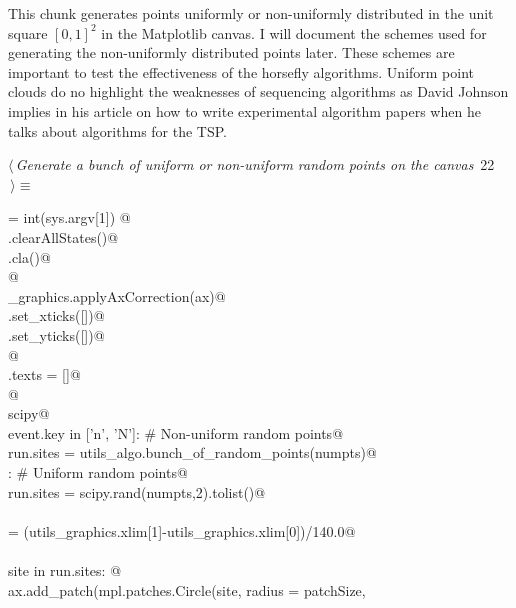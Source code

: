 \documentclass[11.5pt]{report}
\begin{document}
\newchunk This chunk generates points uniformly or non-uniformly distributed in the 
unit square $[0,1]^2$ in the Matplotlib canvas. I will document the schemes used for 
generating the non-uniformly distributed points later. These schemes are important to test the effectiveness of 
the horsefly algorithms. Uniform point clouds do no highlight the weaknesses of 
sequencing algorithms as David Johnson implies in his article on how to write 
experimental algorithm papers when he talks about algorithms for the TSP. 

\begin{flushleft} \small\label{scrap15}\raggedright\small
{} $\langle\,${\itshape Generate a bunch of uniform or non-uniform random points on the canvas}\nobreak\ {\footnotesize {22}}$\,\rangle\equiv$
\vspace{-1ex}
\begin{list}{}{} \item
\mbox{}\verb@numpts = int(sys.argv[1]) @\\
\mbox{}\verb@run.clearAllStates()@\\
\mbox{}\verb@ax.cla()@\\
\mbox{}\verb@               @\\
\mbox{}\verb@utils_graphics.applyAxCorrection(ax)@\\
\mbox{}\verb@ax.set_xticks([])@\\
\mbox{}\verb@ax.set_yticks([])@\\
\mbox{}\verb@                @\\
\mbox{}\verb@fig.texts = []@\\
\mbox{}\verb@                 @\\
\mbox{}\verb@import scipy@\\
\mbox{}\verb@if event.key in ['n', 'N']: # Non-uniform random points@\\
\mbox{}\verb@        run.sites = utils_algo.bunch_of_random_points(numpts)@\\
\mbox{}\verb@else : # Uniform random points@\\
\mbox{}\verb@        run.sites = scipy.rand(numpts,2).tolist()@\\
\mbox{}\verb@@\\
\mbox{}\verb@patchSize  = (utils_graphics.xlim[1]-utils_graphics.xlim[0])/140.0@\\
\mbox{}\verb@@\\
\mbox{}\verb@for site in run.sites:      @\\
\mbox{}\verb@    ax.add_patch(mpl.patches.Circle(site, radius = patchSize, \@\\

\end{list}
\end{flushleft}
\end{document}
